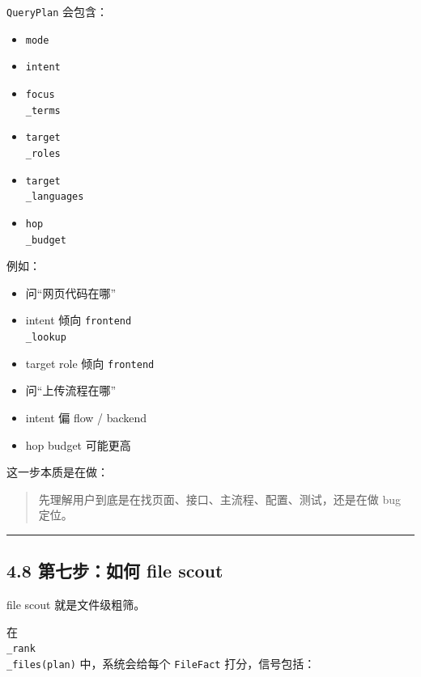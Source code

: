 \documentclass[UTF8,12pt,openany]{ctexbook}
\begin{document}
\texttt{QueryPlan} 会包含：\par

\begin{itemize}
\item \texttt{mode}
\item \texttt{intent}
\item \texttt{focus\\_terms}
\item \texttt{target\\_roles}
\item \texttt{target\\_languages}
\item \texttt{hop\\_budget}
\end{itemize}

例如：\par

\begin{itemize}
\item 问“网页代码在哪”
\item intent 倾向 \texttt{frontend\\_lookup}
\item target role 倾向 \texttt{frontend}
\end{itemize}

\begin{itemize}
\item 问“上传流程在哪”
\item intent 偏 flow / backend
\item hop budget 可能更高
\end{itemize}

这一步本质是在做：\par

\begin{quote}
先理解用户到底是在找页面、接口、主流程、配置、测试，还是在做 bug 定位。
\end{quote}

\hrule

\subsection{4.8 第七步：如何 file scout}

file scout 就是文件级粗筛。\par

在 \texttt{\\_rank\\_files(plan)} 中，系统会给每个 \texttt{FileFact} 打分，信号包括：\par
\end{document}
